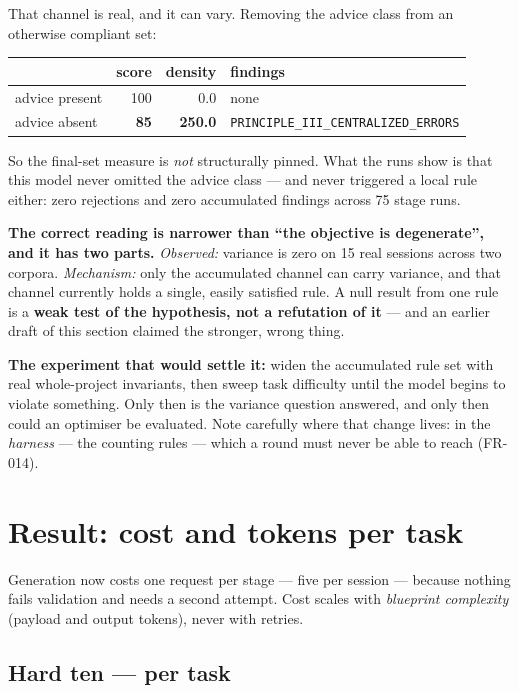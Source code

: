 \documentclass[11pt,a4paper]{article}
\begin{document}
That channel is real, and it can vary. Removing the advice class from an otherwise
compliant set:

\begin{center}
\begin{tabular}{@{}lrrl@{}}
\toprule
& \textbf{score} & \textbf{density} & \textbf{findings} \\
\midrule
advice present & 100 & 0.0 & none \\
advice absent & \textbf{85} & \textbf{250.0} & \texttt{PRINCIPLE\_III\_CENTRALIZED\_ERRORS} \\
\bottomrule
\end{tabular}
\end{center}

So the final-set measure is \emph{not} structurally pinned. What the runs show is that
this model never omitted the advice class --- and never triggered a local rule either:
zero rejections and zero accumulated findings across 75 stage runs.

\textbf{The correct reading is narrower than ``the objective is degenerate'', and it has
two parts.} \emph{Observed:} variance is zero on 15 real sessions across two corpora.
\emph{Mechanism:} only the accumulated channel can carry variance, and that channel
currently holds a single, easily satisfied rule. A null result from one rule is a
\textbf{weak test of the hypothesis, not a refutation of it} --- and an earlier draft of
this section claimed the stronger, wrong thing.

\textbf{The experiment that would settle it:} widen the accumulated rule set with real
whole-project invariants, then sweep task difficulty until the model begins to violate
something. Only then is the variance question answered, and only then could an
optimiser be evaluated. Note carefully where that change lives: in the \emph{harness}
--- the counting rules --- which a round must never be able to reach (FR-014).

\section{Result: cost and tokens per task}

Generation now costs one request per stage --- five per session --- because nothing
fails validation and needs a second attempt. Cost scales with \emph{blueprint
complexity} (payload and output tokens), never with retries.

\subsection{Hard ten --- per task}
\end{document}
